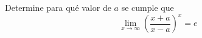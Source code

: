 \item Determine para qué valor de $a$ se cumple que
    \[ \lim_{x \to \infty} \left( \frac{x + a}{x - a} \right)^x = e \]

